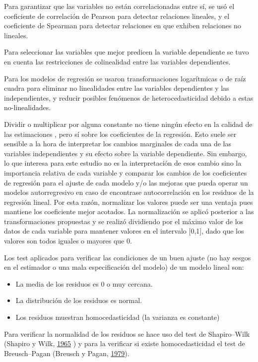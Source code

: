 \documentclass[12pt,a4paper,openany]{book}
\providecommand{\tightlist}{%
  \setlength{\itemsep}{0pt}\setlength{\parskip}{0pt}}
\theoremstyle{definition}
\theoremstyle{definition}
\theoremstyle{definition}
\theoremstyle{remark}
\begin{document}
Para garantizar que las variables no están correlacionadas entre sí, se
usó el coeficiente de correlación de Pearson para detectar relaciones
lineales, y el coeficiente de Spearman para detectar relaciones en que
exhiben relaciones no lineales.

Para seleccionar las variables que mejor predicen la variable
dependiente se tuvo en cuenta las restricciones de colinealidad entre
las variables dependientes.

Para los modelos de regresión se usaron transformaciones logarítmicas o
de raíz cuadra para eliminar no linealidades entre las variables
dependientes y las independientes, y reducir posibles fenómenos de
heterocedasticidad debido a estas no-linealidades.

Dividir o multiplicar por alguna constante no tiene ningún efecto en la
calidad de las estimaciones , pero sí sobre los coeficientes de la
regresión. Esto suele ser sensible a la hora de interpretar los cambios
marginales de cada una de las variables independientes y su efecto sobre
la variable dependiente. Sin embargo, lo que interesa para este estudio
no es la interpretación de esos cambio sino la importancia relativa de
cada variable y comparar los cambios de los coeficientes de regresión
para el ajuste de cada modelo y/o las mejoras que pueda operar un
modelos autorregresivo en caso de encontrase autocorrelación en los
residuos de la regresión lineal. Por esta razón, normalizar los valores
puede ser una ventaja pues mantiene los coeficiente mejor acotados. La
normalización se aplicó posterior a las transformaciones propuestas y se
realizó dividiendo por el máximo valor de los datos de cada variable
para mantener valores en el intervalo {[}0,1{]}, dado que los valores
son todos iguales o mayores que 0.

Los test aplicados para verificar las condiciones de un buen ajuste (no
hay sesgos en el estimador o una mala especificación del modelo) de un
modelo lineal son:

\begin{itemize}
\tightlist
\item
  La media de los residuos es 0 o muy cercana.
\item
  La distribución de los residuos es normal.
\item
  Los residuos muestran homocedasticidad (la varianza es constante)
\end{itemize}

Para verificar la normalidad de los residuos se hace uso del test de
Shapiro--Wilk (Shapiro y Wilk,
\protect\hyperlink{ref-shapiro1965analysis}{1965} ) y para la verificar
si existe homocedasticidad el test de Breusch--Pagan (Breusch y Pagan,
\protect\hyperlink{ref-breusch1979simple}{1979}).
\end{document}
